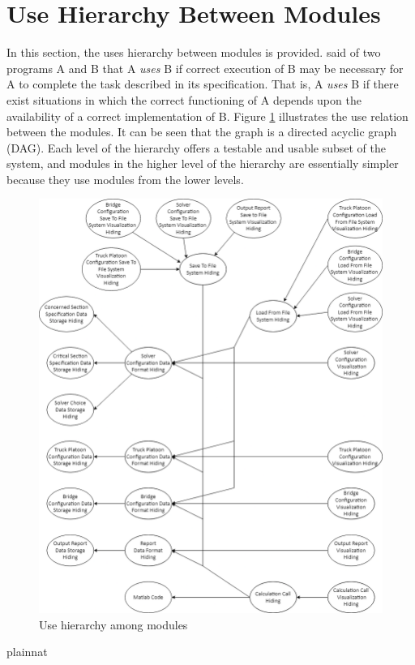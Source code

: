 \documentclass[12pt, titlepage]{article}
\begin{document}
\section{Use Hierarchy Between Modules} \label{SecUse}

In this section, the uses hierarchy between modules is
provided. \citet{Parnas1978} said of two programs A and B that A {\em uses} B if
correct execution of B may be necessary for A to complete the task described in
its specification. That is, A {\em uses} B if there exist situations in which
the correct functioning of A depends upon the availability of a correct
implementation of B.  Figure \ref{FigUH} illustrates the use relation between
the modules. It can be seen that the graph is a directed acyclic graph
(DAG). Each level of the hierarchy offers a testable and usable subset of the
system, and modules in the higher level of the hierarchy are essentially simpler
because they use modules from the lower levels.

\begin{figure}[H]
\centering
\includegraphics[width=1\textwidth]{../images/UseHierarchy.png}
\caption{Use hierarchy among modules}
\label{FigUH}
\end{figure}


 {plainnat}


\newpage{}
\end{document}
